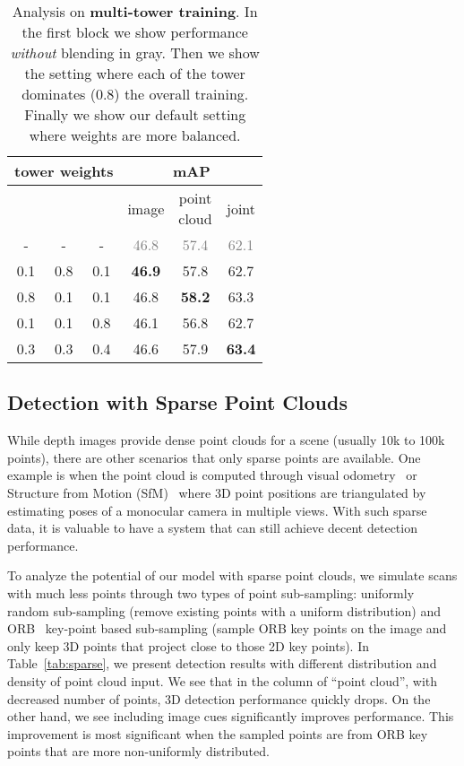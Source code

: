 \documentclass[10pt,twocolumn,letterpaper]{article}
\newcommand\unhighlight[1]{\textcolor{gray}{#1}}
\newcommand{\tablestyle}[2]{\setlength{\tabcolsep}{#1}\renewcommand{\arraystretch}{#2}\centering\footnotesize}
\begin{document}
\begin{table}[t]
\tablestyle{10pt}{1.2}
\begin{tabular}{c|c|c|c|c|c}
\multicolumn{3}{c|}{tower weights} & \multicolumn{3}{c}{mAP} \\
\hline
 &  &  & image & \makecell{point\\cloud} & joint \\
\shline
- & - & - & \unhighlight{46.8} & \unhighlight{57.4} & \unhighlight{62.1} \\
\hline
0.1 & 0.8 & 0.1 & {\bf 46.9} & 57.8 & 62.7 \\
0.8 & 0.1 & 0.1 & 46.8 & {\bf 58.2} & 63.3 \\
0.1 & 0.1 & 0.8 & 46.1 & 56.8 & 62.7 \\
\hline
0.3 & 0.3 & 0.4 & 46.6 & 57.9 & {\bf 63.4} \\
\end{tabular}
\vspace{2mm}
\caption{Analysis on {\bf multi-tower training}. In the first block we show performance \emph{without} blending in gray. Then we show the setting where each of the tower dominates (0.8) the overall training. Finally we show our default setting where weights are more balanced.}
\label{tab:tower_weights}
\vspace{-1mm}
\end{table}


\subsection{Detection with Sparse Point Clouds}
\label{sec:exp:sparse}
While depth images provide dense point clouds for a scene (usually 10k to 100k points), there are other scenarios that only sparse points are available. One example is when the point cloud is computed through visual odometry~\cite{nister2004visual} or Structure from Motion (SfM)~\cite{koenderink1991affine} where 3D point positions are triangulated by estimating poses of a monocular camera in multiple views. With such sparse data, it is valuable to have a system that can still achieve decent detection performance.

To analyze the potential of our model with sparse point clouds, we simulate scans with much less points through two types of point sub-sampling: uniformly random sub-sampling (remove existing points with a uniform distribution) and ORB~\cite{rublee2011orb} key-point based sub-sampling (sample ORB key points on the image and only keep 3D points that project close to those 2D key points). In Table~\ref{tab:sparse}, we present detection results with different distribution and density of point cloud input. We see that in the column of ``point cloud'', with decreased number of points, 3D detection performance quickly drops. On the other hand, we see including image cues significantly improves performance. This improvement is most significant when the sampled points are from ORB key points that are more non-uniformly distributed.
\end{document}
